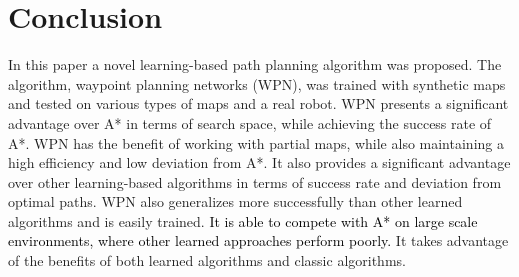 \documentclass[journal, twocolumn]{IEEEtran}
\begin{document}
\begin{table}[] 
\caption{Results from large map experiment, demonstrating WPN's ability to plan on large maps while maintaining a high accuracy and low search space. Maps used were city style maps~\cite{sturtevant2012benchmarks}. Algorithms were run on 30 maps, with two attempts per map (with different start and goal points for each attempt.)}
\centering
{}
\label{tab:largemaps}
\end{table}





\section{Conclusion}
\label{sec:conclusion}
In this paper a novel learning-based path planning algorithm was proposed. The algorithm, waypoint planning networks (WPN), was trained with synthetic maps and tested on various types of maps and a real robot. WPN presents a significant advantage over A* in terms of search space, while achieving the success rate of A*. WPN has the benefit of working with partial maps, while also maintaining a high efficiency and low deviation from A*. It also provides a significant advantage over other learning-based algorithms in terms of success rate and deviation from optimal paths. WPN also generalizes more successfully than other learned algorithms and is easily trained. \textcolor{black}{It is able to compete with A* on large scale environments, where other learned approaches perform poorly.} It takes advantage of the benefits of both learned algorithms and classic algorithms. 
\end{document}
